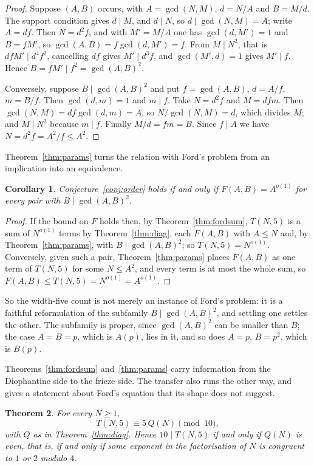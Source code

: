 \documentclass[11pt]{article}
\theoremstyle{plain}
\newtheorem{theorem}{Theorem}[section]
\newtheorem{corollary}[theorem]{Corollary}
\theoremstyle{definition}
\begin{document}
\begin{proof}
Suppose $(A,B)$ occurs, with $A=\gcd(N,M)$, $d=N/A$ and $B=M/d$. The support condition
gives $d\mid M$, and $d\mid N$, so $d\mid\gcd(N,M)=A$; write $A=df$. Then $N=d^{2}f$, and
with $M'=M/A$ one has $\gcd(d,M')=1$ and $B=fM'$, so $\gcd(A,B)=f\gcd(d,M')=f$. From
$M\mid N^{2}$, that is $dfM'\mid d^{4}f^{2}$, cancelling $df$ gives $M'\mid d^{3}f$, and
$\gcd(M',d)=1$ gives $M'\mid f$. Hence $B=fM'\mid f^{2}=\gcd(A,B)^2$.

Conversely, suppose $B\mid\gcd(A,B)^{2}$ and put $f=\gcd(A,B)$, $d=A/f$, $m=B/f$. Then
$\gcd(d,m)=1$ and $m\mid f$. Take $N=d^{2}f$ and $M=dfm$. Then $\gcd(N,M)=df\gcd(d,m)=A$,
so $N/\gcd(N,M)=d$, which divides $M$; and $M\mid N^{2}$ because $m\mid f$. Finally
$M/d=fm=B$. Since $f\mid A$ we have $N=d^{2}f=A^{2}/f\le A^{2}$.
\end{proof}

Theorem~\ref{thm:params} turns the relation with Ford's problem from an implication into an
equivalence.

\begin{corollary}\label{cor:equiv}
Conjecture~\ref{conj:order} holds if and only if $F(A,B)=A^{o(1)}$ for every pair with
$B\mid\gcd(A,B)^{2}$.
\end{corollary}

\begin{proof}
If the bound on $F$ holds then, by Theorem~\ref{thm:fordsum}, $T(N,5)$ is a sum of
$N^{o(1)}$ terms by Theorem~\ref{thm:diag}, each $F(A,B)$ with $A\le N$ and, by
Theorem~\ref{thm:params}, with $B\mid\gcd(A,B)^{2}$; so $T(N,5)=N^{o(1)}$. Conversely,
given such a pair, Theorem~\ref{thm:params} places $F(A,B)$ as one term of $T(N,5)$ for
some $N\le A^{2}$, and every term is at most the whole sum, so
$F(A,B)\le T(N,5)=N^{o(1)}=A^{o(1)}$.
\end{proof}

So the width-five count is not merely an instance of Ford's problem: it is a faithful
reformulation of the subfamily $B\mid\gcd(A,B)^{2}$, and settling one settles the other.
The subfamily is proper, since $\gcd(A,B)^2$ can be smaller than $B$; the case $A=B=p$,
which is $A(p)$, lies in it, and so does $A=p$, $B=p^{2}$, which is $B(p)$.

Theorems~\ref{thm:fordsum} and~\ref{thm:params} carry information from the Diophantine
side to the frieze side. The transfer also runs the other way, and gives a statement about
Ford's equation that its shape does not suggest.

\begin{theorem}\label{thm:modten}
For every $N\ge1$,
\[
  T(N,5)\equiv 5\,Q(N) \pmod{10},
\]
with $Q$ as in Theorem~\ref{thm:diag}. Hence $10\mid T(N,5)$ if and only if $Q(N)$ is even,
that is, if and only if some exponent in the factorisation of $N$ is congruent to $1$ or
$2$ modulo $4$.
\end{theorem}
\end{document}
